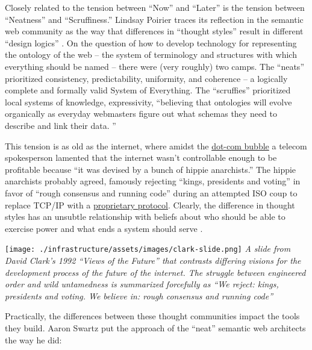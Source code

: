 Closely related to the tension between ``Now'' and ``Later'' is the
tension between ``Neatness'' and ``Scruffiness.'' Lindsay Poirier traces
its reflection in the semantic web community as the way that differences
in ``thought styles'' result in different ``design logics'' \citep{poirierTurnScruffyEthnographic2017} . On the question of how to
develop technology for representing the ontology of the web -- the
system of terminology and structures with which everything should be
named -- there were (very roughly) two camps. The ``neats'' prioritized
consistency, predictability, uniformity, and coherence -- a logically
complete and formally valid System of Everything. The ``scruffies''
prioritized local systems of knowledge, expressivity, ``believing that
ontologies will evolve organically as everyday webmasters figure out
what schemas they need to describe and link their data. \citep{poirierTurnScruffyEthnographic2017} ''

This tension is as old as the internet, where amidst the
\href{https://en.wikipedia.org/wiki/Dot-com_bubble}{dot-com bubble} a
telecom spokesperson lamented that the internet wasn't controllable
enough to be profitable because ``it was devised by a bunch of hippie
anarchists.'' \citep{hiltzikTamingWildWild2001}  The hippie
anarchists probably agreed, famously rejecting ``kings, presidents and
voting'' in favor of ``rough consensus and running code'' during an
attempted ISO coup to replace TCP/IP with a
\href{https://www.iso.org/standard/35872.html}{proprietary protocol}.
Clearly, the difference in thought styles has an unsubtle relationship
with beliefs about who should be able to exercise power and what ends a
system should serve \citep{larsenPoliticalNatureTCP2012} .

\texttt{[image: ./infrastructure/assets/images/clark-slide.png]} \emph{A
slide from David Clark's 1992 ``Views of the Future''\citep{clarkCloudyCrystalBall1992}  that contrasts differing visions for the
development process of the future of the internet. The struggle between
engineered order and wild untamedness is summarized forcefully as ``We
reject: kings, presidents and voting. We believe in: rough consensus and
running code''}

Practically, the differences between these thought communities impact
the tools they build. Aaron Swartz put the approach of the ``neat''
semantic web architects the way he did:

